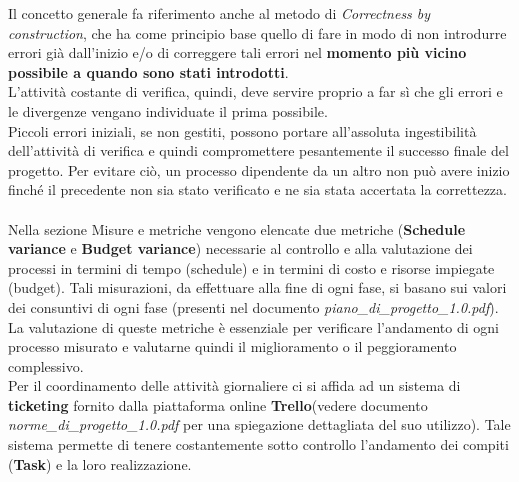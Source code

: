 \documentclass[a4paper,11pt]{article}
\begin{document}
Il concetto generale fa riferimento anche al metodo di \textit{Correctness by construction}, che ha come principio base quello di fare in modo di non introdurre errori già dall'inizio e/o di correggere tali errori nel \textbf{momento più vicino possibile a quando sono stati introdotti}.\\ L'attività costante di verifica, quindi,  deve servire proprio a far sì che gli errori e le divergenze vengano individuate il prima possibile.\\
Piccoli errori iniziali, se non gestiti, possono portare all'assoluta ingestibilità dell'attività di verifica e quindi compromettere pesantemente il successo finale del progetto. Per evitare ciò, un processo dipendente da un altro non può avere inizio finché il precedente non sia stato verificato e ne sia stata accertata la correttezza.\\\\ %
Nella sezione Misure e metriche vengono elencate due metriche (\textbf{Schedule variance} e \textbf{Budget variance}) necessarie al controllo e alla valutazione dei processi in termini di tempo (schedule) e in termini di costo e risorse impiegate (budget). 
Tali misurazioni, da effettuare alla fine di ogni fase, si basano sui valori dei consuntivi di ogni fase (presenti nel documento \textit{piano\_di\_progetto\_1.0.pdf}). La valutazione di queste metriche è essenziale per verificare l'andamento di ogni processo misurato e valutarne quindi il miglioramento o il peggioramento complessivo. \\
Per il coordinamento delle attività giornaliere ci si affida ad un sistema di \textbf{ticketing\addglos} fornito dalla piattaforma online \textbf{Trello}\addglos (vedere documento \textit{norme\_di\_progetto\_1.0.pdf} per una spiegazione dettagliata del suo utilizzo). Tale sistema permette di tenere costantemente sotto controllo l'andamento dei compiti (\textbf{Task}\addglos) e la loro realizzazione. 
\end{document}
